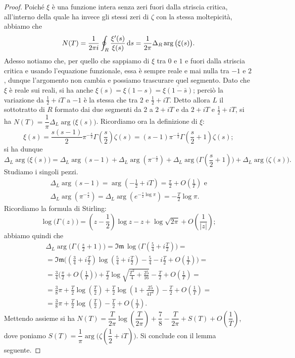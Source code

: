 \begin{proof}
  Poiché $\xi$ è una funzione intera senza zeri fuori dalla striscia critica, all'interno della quale ha invece gli stessi zeri di $\zeta$ con la stessa moltepicità, abbiamo che
  $$N(T)=\frac{1}{2\pi i} \oint_R \frac{\xi'(s)}{\xi(s)}\mathop{}\!\mathrm{d} s=\frac{1}{2\pi}\Delta_R \arg\big(\xi(s)\big).$$
  Adesso notiamo che, per quello che sappiamo di $\xi$ tra $0$ e $1$ e fuori dalla striscia critica e usando l'equazione funzionale, essa è sempre reale e mai nulla tra $-1$ e $2$, dunque l'argomento non cambia e possiamo trascurare quel segmento. Dato che $\xi$ è reale sui reali, si ha anche $\xi(s)=\xi(1-s)=\overline{\xi(1-\bar{s})}$; perciò la variazione da $\frac{1}{2}+iT$ a $-1$ è la stessa che tra $2$ e $\frac{1}{2}+iT$.
  Detto allora $L$ il sottotratto di $R$ formato dai due segmenti da $2$ a $2+iT$ e da $2+iT$ e $\frac{1}{2}+iT$, si ha $N(T)=\dfrac{1}{\pi}\Delta_L \arg\big(\xi(s)\big)$. Ricordiamo ora la definizione di $\xi$:
  $$\xi(s)=\frac{s(s-1)}{2}\pi^{-\frac{s}{2}}\Gamma\left(\frac{s}{2}\right)\zeta(s)=(s-1)\pi^{-\frac{s}{2}}\Gamma\left(\frac{s}{2}+1\right)\zeta(s);$$
  si ha dunque
  $$\Delta_L\arg\big(\xi(s)\big)=\Delta_L\arg(s-1)+\Delta_L\arg\left(\pi^{-\frac{s}{2}}\right)+\Delta_L\arg\Bigg(\Gamma\left(\frac{s}{2}+1\right)\Bigg)+\Delta_L\arg\big(\zeta(s)\big).$$
  Studiamo i singoli pezzi.
  \begin{gather*}
    \Delta_L\arg(s-1)=\arg\left(-\frac{1}{2}+iT\right)=\frac{\pi}{2}+O\left(\frac{1}{T}\right) \text{ e}\\
    \Delta_L\arg\left(\pi^{-\frac{s}{2}}\right)=\Delta_L\arg\left(e^{-\frac{s}{2}\log{\pi}}\right)=-\frac{T}{2}\log{\pi}.
  \end{gather*}
  Ricordiamo la formula di Stirling:
  $$\log\big(\Gamma(z)\big)=\left(z-\frac{1}{2}\right)\log{z}-z+\log{\sqrt{2\pi}}+O\left(\frac{1}{|z|}\right);$$
  abbiamo quindi che
  \begin{gather*}
    \Delta_L\arg\Bigg(\Gamma\left(\frac{s}{2}+1\right)\Bigg)=\mathfrak{Im}\,\log\Bigg(\Gamma\left(\frac{5}{4}+i\frac{T}{2}\right)\Bigg)= \\
    =\mathfrak{Im}\Bigg(\left(\frac{3}{4}+i\frac{T}{2}\right)\log\left(\frac{5}{4}+i\frac{T}{2}\right)-\frac{5}{4}-i\frac{T}{2}+O\left(\frac{1}{T}\right)\Bigg)= \\
    =\frac{3}{4}\Bigg(\frac{\pi}{2}+O\left(\frac{1}{T}\right)\Bigg)+\frac{T}{2}\log\sqrt{\frac{T^2}{4}+\frac{25}{16}}-\frac{T}{2}+O\left(\frac{1}{T}\right)=\\
    =\frac{3}{8}\pi+\frac{T}{2}\log\left(\frac{T}{2}\right)+\frac{T}{2}\log\left(1+\frac{25}{4T^2}\right)-\frac{T}{2}+O\left(\frac{1}{T}\right)=\\
    =\frac{3}{8}\pi+\frac{T}{2}\log\left(\frac{T}{2}\right)-\frac{T}{2}+O\left(\frac{1}{T}\right).
  \end{gather*}
  Mettendo assieme si ha $N(T)=\dfrac{T}{2\pi}\log\left(\dfrac{T}{2\pi}\right)+\dfrac{7}{8}-\dfrac{T}{2\pi}+S(T)+O\left(\dfrac{1}{T}\right)$, dove poniamo $S(T)=\dfrac{1}{\pi}\arg\Bigg(\zeta\left(\dfrac{1}{2}+iT\right)\Bigg)$. Si conclude con il lemma seguente.
\end{proof}

